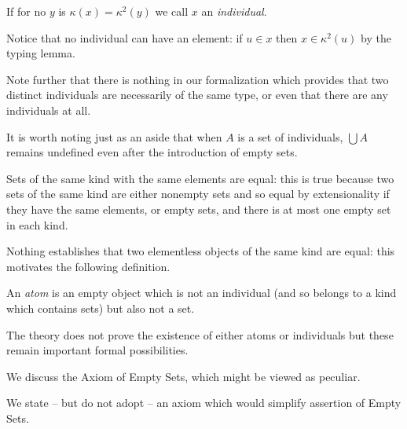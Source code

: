 \documentclass[12pt]{article}
\begin{document}
\endproof


\begin{dfn}If for no $y$ is $\kappa(x)=\kappa^2(y)$ we call $x$ an {\em individual\/}.\end{dfn}

Notice that no 
individual can have an element:  if $u \in x$ then $x \in \kappa^2(u)$ by the typing lemma.

Note further that there is nothing in our formalization which provides that two distinct individuals are necessarily of the same type, or even that there are any individuals at all.

It is worth noting just as an aside that when $A$ is a set of individuals, $\bigcup A$ remains undefined even after the introduction of empty sets.



Sets of the same kind with the same elements are equal:  this is true because two sets of the same kind are either nonempty sets and so equal by extensionality if they have the same elements, or empty sets, and there is at most one empty set in each kind.

Nothing establishes that two elementless objects of the same kind are equal:  this motivates the following definition.

\begin{dfn} An {\em atom\/} is an empty object which is not an individual (and so belongs to a kind which contains sets) but also not a set.\end{dfn}

The theory does not prove the existence of either atoms or individuals but these remain important formal possibilities.

\medskip

We discuss the Axiom of Empty Sets, which might be viewed as peculiar.

We state -- but do not adopt -- an axiom which would simplify assertion of Empty Sets.
\end{document}

